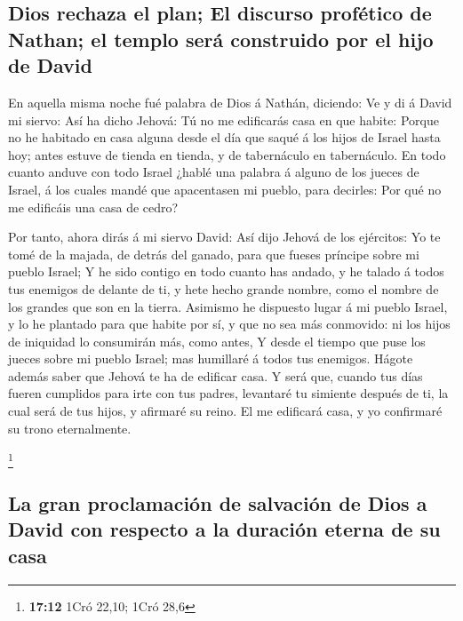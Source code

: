 \hypertarget{dios-rechaza-el-plan-el-discurso-profuxe9tico-de-nathan-el-templo-seruxe1-construido-por-el-hijo-de-david}{%
\subsection{Dios rechaza el plan; El discurso profético de Nathan; el
templo será construido por el hijo de
David}\label{dios-rechaza-el-plan-el-discurso-profuxe9tico-de-nathan-el-templo-seruxe1-construido-por-el-hijo-de-david}}

 En aquella misma noche fué palabra de Dios á Nathán,
diciendo:  Ve y di á David mi siervo: Así ha dicho Jehová:
Tú no me edificarás casa en que habite:  Porque no he
habitado en casa alguna desde el día que saqué á los hijos de Israel
hasta hoy; antes estuve de tienda en tienda, y de tabernáculo en
tabernáculo.  En todo cuanto anduve con todo Israel ¿hablé
una palabra á alguno de los jueces de Israel, á los cuales mandé que
apacentasen mi pueblo, para decirles: Por qué no me edificáis una casa
de cedro?

 Por tanto, ahora dirás á mi siervo David: Así dijo Jehová
de los ejércitos: Yo te tomé de la majada, de detrás del ganado, para
que fueses príncipe sobre mi pueblo Israel;  Y he sido
contigo en todo cuanto has andado, y he talado á todos tus enemigos de
delante de ti, y hete hecho grande nombre, como el nombre de los grandes
que son en la tierra.  Asimismo he dispuesto lugar á mi
pueblo Israel, y lo he plantado para que habite por sí, y que no sea más
conmovido: ni los hijos de iniquidad lo consumirán más, como antes,
 Y desde el tiempo que puse los jueces sobre mi pueblo
Israel; mas humillaré á todos tus enemigos. Hágote además saber que
Jehová te ha de edificar casa.  Y será que, cuando tus
días fueren cumplidos para irte con tus padres, levantaré tu simiente
después de ti, la cual será de tus hijos, y afirmaré su reino.
 El me edificará casa, y yo confirmaré su trono
eternalmente.

\footnote{\textbf{17:12} 1Cró 22,10; 1Cró 28,6}

\hypertarget{la-gran-proclamaciuxf3n-de-salvaciuxf3n-de-dios-a-david-con-respecto-a-la-duraciuxf3n-eterna-de-su-casa}{%
\subsection{La gran proclamación de salvación de Dios a David con
respecto a la duración eterna de su
casa}\label{la-gran-proclamaciuxf3n-de-salvaciuxf3n-de-dios-a-david-con-respecto-a-la-duraciuxf3n-eterna-de-su-casa}}

